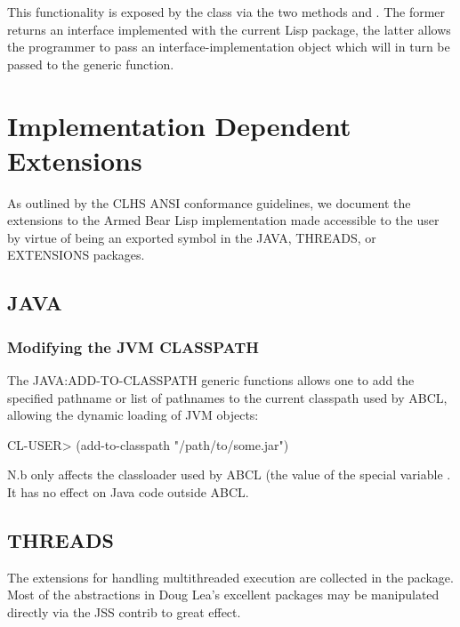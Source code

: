 \documentclass[10pt]{book}
\begin{document}
This functionality is exposed by the class  via
the two methods  and
. The former returns an interface
implemented with the current Lisp package, the latter allows the
programmer to pass an interface-implementation object which will in turn
be passed to the  generic function.

\chapter{Implementation Dependent Extensions}

As outlined by the CLHS ANSI conformance guidelines, we document the
extensions to the Armed Bear Lisp implementation made accessible to
the user by virtue of being an exported symbol in the JAVA, THREADS,
or EXTENSIONS packages.

\section{JAVA}

\subsection{Modifying the JVM CLASSPATH}

The JAVA:ADD-TO-CLASSPATH generic functions allows one to add the
specified pathname or list of pathnames to the current classpath
used by ABCL, allowing the dynamic loading of JVM objects:

\begin{listing-lisp}
CL-USER> (add-to-classpath "/path/to/some.jar")
\end{listing-lisp}

N.b  only affects the classloader used by ABCL
(the value of the special variable . It has
no effect on Java code outside ABCL.



\section{THREADS}

The extensions for handling multithreaded execution are collected in
the  package.  Most of the abstractions in Doug Lea's
excellent  packages may be manipulated
directly via the JSS contrib to great effect.
\end{document}
